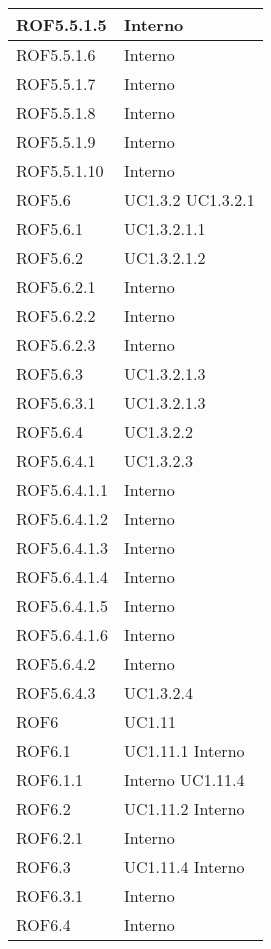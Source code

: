 \begin{center}
\begin{longtable}{| p{4cm} | p{4cm} |}
\hline
ROF5.5.1.5   &  Interno \\
\hline
ROF5.5.1.6   &  Interno \\
\hline
ROF5.5.1.7   &  Interno \\
\hline
ROF5.5.1.8   &  Interno \\
\hline
ROF5.5.1.9   &  Interno \\
\hline
ROF5.5.1.10   &  Interno \\
\hline
ROF5.6   &  UC1.3.2 \newline UC1.3.2.1 \\
\hline
ROF5.6.1   &  UC1.3.2.1.1 \\
\hline
ROF5.6.2   &  UC1.3.2.1.2 \\
\hline
ROF5.6.2.1   &  Interno \\
\hline
ROF5.6.2.2   &  Interno \\
\hline
ROF5.6.2.3   &  Interno \\
\hline
ROF5.6.3   &  UC1.3.2.1.3 \\
\hline
ROF5.6.3.1   &  UC1.3.2.1.3 \\
\hline
ROF5.6.4   &  UC1.3.2.2 \\
\hline
ROF5.6.4.1   &  UC1.3.2.3 \\
\hline
ROF5.6.4.1.1   &  Interno \\
\hline
ROF5.6.4.1.2   &  Interno \\
\hline
ROF5.6.4.1.3   &  Interno \\
\hline
ROF5.6.4.1.4   &  Interno \\
\hline
ROF5.6.4.1.5   &  Interno \\
\hline
ROF5.6.4.1.6   &  Interno \\
\hline
ROF5.6.4.2   &  Interno \\
\hline
ROF5.6.4.3   &  UC1.3.2.4 \\
\hline
ROF6   &  UC1.11 \\
\hline
ROF6.1   &  UC1.11.1 \newline Interno \\
\hline
ROF6.1.1   &  Interno \newline UC1.11.4 \\
\hline
ROF6.2   &  UC1.11.2 \newline Interno \\
\hline
ROF6.2.1   &  Interno \\
\hline
ROF6.3   &  UC1.11.4 \newline Interno \\
\hline
ROF6.3.1   &  Interno \\
\hline
ROF6.4   &  Interno \\

\end{longtable}
\end{center}
